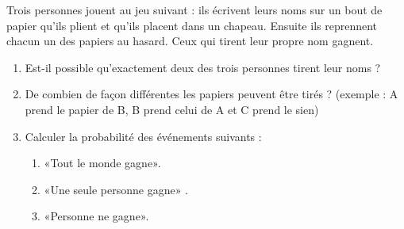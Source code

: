 
\begin{exercice}\label{exosmath-0188}

    Trois personnes jouent au jeu suivant : ils écrivent leurs noms sur un bout de papier qu'ils plient et qu'ils placent dans un chapeau. Ensuite ils reprennent chacun un des papiers au hasard. Ceux qui tirent leur propre nom gagnent.
    \begin{enumerate}
        \item
            Est-il possible qu'exactement deux des trois personnes tirent leur noms ?
        \item
            De combien de façon différentes les papiers peuvent être tirés ? (exemple : A prend le papier de B, B prend celui de A et C prend le sien) 
        \item
            Calculer la probabilité des événements suivants :
            \begin{enumerate}
                \item
                    «Tout le monde gagne».
                \item
                    «Une seule personne gagne» .
                \item
                    «Personne ne gagne».
            \end{enumerate}
    \end{enumerate}

\end{exercice}

